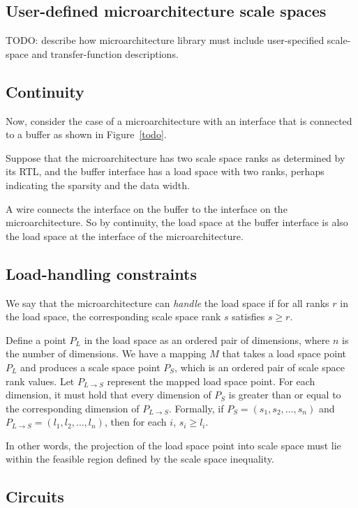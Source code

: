 \subsection{User-defined microarchitecture scale spaces}

TODO: describe how microarchitecture library must include user-specified scale-space and transfer-function descriptions.

\subsection{Continuity}

Now, consider the case of a microarchitecture with an interface that is connected to a buffer as shown in Figure~\ref{todo}.

Suppose that the microarchitecture has two scale space ranks as determined by its RTL, and the buffer interface has a load space with two ranks, perhaps indicating the sparsity and the data width.

A wire connects the interface on the buffer to the interface on the microarchitecture. So by continuity, the load space at the buffer interface is also the load space at the interface of the microarchitecture.

\subsection{Load-handling constraints}

We say that the microarchitecture can \textit{handle} the load space if for all ranks $r$ in the load space, the corresponding scale space rank $s$ satisfies $s \geq r$.

Define a point $P_L$ in the load space as an ordered pair of dimensions, where $n$ is the number of dimensions. We have a mapping $M$ that takes a load space point $P_L$ and produces a scale space point $P_S$, which is an ordered pair of scale space rank values. Let $P_{L \rightarrow S}$ represent the mapped load space point. For each dimension, it must hold that every dimension of $P_S$ is greater than or equal to the corresponding dimension of $P_{L \rightarrow S}$. Formally, if $P_S = (s_1, s_2, \ldots, s_n)$ and $P_{L \rightarrow S} = (l_1, l_2, \ldots, l_n)$, then for each $i$, $s_i \geq l_i$.

In other words, the projection of the load space point into scale space must lie within the feasible region defined by the scale space inequality.

\subsection{Circuits}

